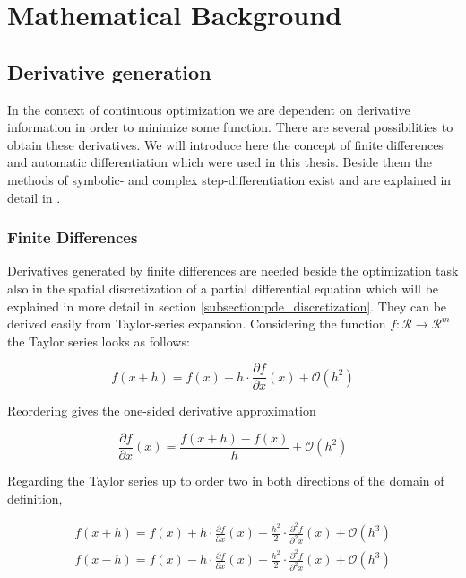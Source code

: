 \documentclass{scrartcl}[12pt, halfparskip]
\numberwithin{equation}{section}
\numberwithin{figure}{section}
\numberwithin{table}{section}
\begin{document}
\newpage
\section{Mathematical Background}

\subsection{Derivative generation}
In the context of continuous optimization we are dependent on derivative information in order to minimize some function. 
There are several possibilities to obtain these derivatives. We will introduce here the concept of finite differences and automatic differentiation which were used in this thesis. 
Beside them the methods of symbolic- and complex step-differentiation exist and are explained in detail in \cite{diss_jan}.

\subsubsection{Finite Differences}
\label{subsubsec:finite_differences}
Derivatives generated by finite differences are needed beside the optimization task also in the spatial discretization of a partial differential equation which will be explained in more detail in section \ref{subsection:pde_discretization}.
They can be derived easily from Taylor-series expansion. Considering the function $f: \mathcal{R} \rightarrow \mathcal{R}^m$ the Taylor series looks as follows:


\begin{equation}
f(x+h) = f(x) + h \cdot \frac{\partial f}{\partial x}(x) + \mathcal{O}(h^2)
\end{equation}

Reordering gives the one-sided derivative approximation

\begin{equation}
\frac{\partial f}{\partial x}(x) = \frac{f(x+h) - f(x)}{h} + \mathcal{O}(h^2)
\end{equation}

Regarding the Taylor series up to order two in both directions of the domain of definition,

\begin{subequations}
	\label{eq:finite_differences_taylor_exp}
	\begin{align}
	f(x+h) = f(x) + h \cdot \frac{\partial f}{\partial x}(x) + \frac{h^2}{2} \cdot \frac{\partial^2 f}{\partial^2 x}(x) + \mathcal{O}(h^3) \label{eq:finite_differences_taylor_exp_+} \\
	f(x-h) = f(x) - h \cdot \frac{\partial f}{\partial x}(x) + \frac{h^2}{2} \cdot \frac{\partial^2 f}{\partial^2 x}(x) + \mathcal{O}(h^3)  \label{eq:finite_differences_taylor_exp_-}	
	\end{align}
\end{subequations}
\end{document}
